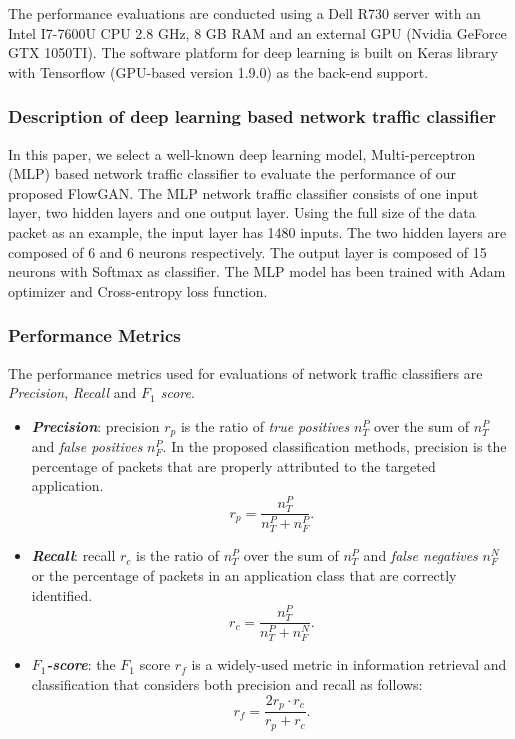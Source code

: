 \documentclass[letterpaper,12pt]{article}
\begin{document}
The performance evaluations are conducted using a Dell R730 server with an Intel I7-7600U CPU \@ 2.8 GHz, 8 GB RAM and an external GPU (Nvidia GeForce GTX 1050TI). The software platform for deep learning is built on Keras library with Tensorflow (GPU-based version 1.9.0) as the back-end support. 

\subsubsection{Description of deep learning based network traffic classifier}
In this paper, we select a well-known deep learning model, Multi-perceptron (MLP) based network traffic classifier to evaluate the performance of our proposed FlowGAN. The MLP network traffic classifier consists of one input layer, two hidden layers and one output layer. Using the full size of the data packet as an example, the input layer has 1480 inputs. The two hidden layers are composed of 6 and 6 neurons respectively. The output layer is composed of 15 neurons with Softmax as classifier. The MLP model has been trained with Adam optimizer and Cross-entropy loss function. 


\subsubsection{Performance Metrics}

The performance metrics used for evaluations of network traffic classifiers are \emph{Precision}, \emph{Recall} and \emph{$F_1$ score}.
\begin{itemize}
	
	\item \textbf{\emph{Precision}}: precision $r_{p}$ is the ratio of \emph{true positives} $n_T^P$ over the sum of $n_T^P$ and \emph{false positives} $n_F^P$. In the proposed classification methods, precision is the percentage of packets that are properly attributed to the targeted application.
	\begin{equation}
	r_p = \frac{n_T^P}{n_T^P+n_F^P}.
	\end{equation}
	
	\item \textbf{\emph{Recall}}: recall $r_c$ is the ratio of $n_T^P$ over the sum of $n_T^P$ and \emph{false negatives} $n_F^N$ or the percentage of packets in an application class that are correctly identified.
	\begin{equation}
	r_c = \frac{n_T^P}{n_T^P+n_F^N}.
	\end{equation}
	
	\item \textbf{\emph{$F_1$-score}}: the $F_1$ score $r_f$ is a widely-used metric in information retrieval and classification that considers both precision and recall as follows:
	\begin{equation}
	r_f = \frac{2 r_p \cdot r_c}{r_p + r_c}.
	\end{equation}
	
\end{itemize}
\end{document}
